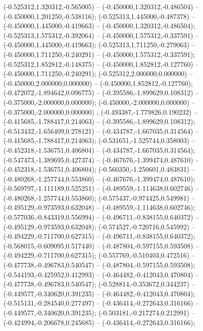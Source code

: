  (-0.525312,1.320312,-0.565005) -- (-0.450000,1.320312,-0.486504) -- (-0.450000,1.201250,-0.538116);
 (-0.525313,1.445000,-0.487378) -- (-0.450000,1.445000,-0.419663) -- (-0.450000,1.320312,-0.486504);
 (-0.525313,1.575312,-0.392064) -- (-0.450000,1.575312,-0.337591) -- (-0.450000,1.445000,-0.419663);
 (-0.525313,1.711250,-0.279063) -- (-0.450000,1.711250,-0.240291) -- (-0.450000,1.575312,-0.337591);
 (-0.525312,1.852812,-0.148375) -- (-0.450000,1.852812,-0.127760) -- (-0.450000,1.711250,-0.240291);
 (-0.525312,2.000000,0.000000) -- (-0.450000,2.000000,0.000000) -- (-0.450000,1.852812,-0.127760);
 (-0.472072,-1.894642,0.096775) -- (-0.395586,-1.899629,0.108312) -- (-0.375000,-2.000000,0.000000);
 (-0.450000,-2.000000,0.000000) -- (-0.375000,-2.000000,0.000000) ;
 (-0.493387,-1.779826,0.190232) -- (-0.415685,-1.788417,0.214063) -- (-0.395586,-1.899629,0.108312);
 (-0.513432,-1.656409,0.278121) -- (-0.434787,-1.667035,0.314564) -- (-0.415685,-1.788417,0.214063);
 (-0.531651,-1.525744,0.358003) -- (-0.452318,-1.536751,0.406804) -- (-0.434787,-1.667035,0.314564);
 (-0.547473,-1.389695,0.427374) -- (-0.467676,-1.399474,0.487610) -- (-0.452318,-1.536751,0.406804);
 (-0.560350,-1.250601,0.483831) -- (-0.480268,-1.257744,0.553860) -- (-0.467676,-1.399474,0.487610);
 (-0.569797,-1.111189,0.525251) -- (-0.489559,-1.114638,0.602746) -- (-0.480268,-1.257744,0.553860);
 (-0.575437,-0.974425,0.549981) -- (-0.495129,-0.973593,0.632048) -- (-0.489559,-1.114638,0.602746);
 (-0.577036,-0.843319,0.556994) -- (-0.496711,-0.838155,0.640372) -- (-0.495129,-0.973593,0.632048);
 (-0.574527,-0.720716,0.545992) -- (-0.494229,-0.711700,0.627315) -- (-0.496711,-0.838155,0.640372);
 (-0.568015,-0.609095,0.517440) -- (-0.487804,-0.597155,0.593508) -- (-0.494229,-0.711700,0.627315);
 (-0.557769,-0.510403,0.472516) -- (-0.477738,-0.496783,0.540547) -- (-0.487804,-0.597155,0.593508);
 (-0.544193,-0.425952,0.412993) -- (-0.464482,-0.412043,0.470804) -- (-0.477738,-0.496783,0.540547);
 (-0.528814,-0.353672,0.344237) -- (-0.449577,-0.340620,0.391235) -- (-0.464482,-0.412043,0.470804);
 (-0.515131,-0.284540,0.277497) -- (-0.436414,-0.272643,0.316166) -- (-0.449577,-0.340620,0.391235);
 (-0.503181,-0.217274,0.212991) -- (-0.424994,-0.206678,0.245685) -- (-0.436414,-0.272643,0.316166);
